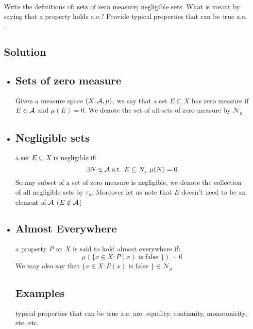 
\question
Write the definitions of: sets of zero measure; negligible sets. What is meant by saying that a property holds a.e.? Provide typical properties that can be true a.e. .

\subsection*{Solution}

\provdefs
\begin{itemize}
    \item \subsection{Sets of zero measure} 
    Given a measure space $(X,\mathcal{A},\mu)$, we say that a set $E\subseteq X$ has zero measure if $E\in\mathcal{A}$ and $\mu(E)=0$. We denote the set of all sets of zero measure by $\mathcal{N}_{\mu}$
    \item \subsection{Negligible sets} a set $E\subseteq X$ is negligible if:
    \[
        \exists N\in\mathcal{A} \text{ s.t. } E \subseteq N, \; \mu(N)=0
    \]
    So any subset of a set of zero measure is negligible, we denote the collection of all negligible sets by $\tau_{\mu}$. Moreover let us note that $E$ doesn't need to be an element of $\mathcal{A}$ ($E\notin\mathcal{A}$)
    \item \subsection{Almost Everywhere} a property $P$ on $X$ is said to hold almost everywhere if:
    \[
       \mu( \{ x\in X: P(x) \text{ is false } \} ) = 0    
    \]
    We may also say that $\{ x\in X: P(x) \text{ is false } \} \in \mathcal{N}_{\mu}$\\
    \subsection*{Examples} typical properties that can be true a.e. are: equality, continuity, monotonicity, etc. etc.
\end{itemize}